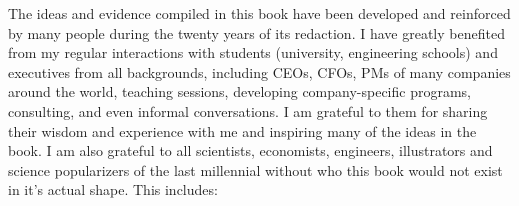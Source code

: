 The ideas and evidence compiled in this book have been developed and reinforced by many people during the twenty years of its redaction. I have greatly benefited from my regular interactions with students (university, engineering schools) and executives from all backgrounds, including CEOs, CFOs, PMs of many companies around the world, teaching sessions, developing company-specific programs, consulting, and even informal conversations. I am grateful to them for sharing their wisdom and experience with me and inspiring many of the ideas in the book. I am also grateful to all scientists, economists, engineers, illustrators and science popularizers of the last millennial without who this book would not exist in it's actual shape. This includes:

	\begin{spacing}{0.5}
	\begin{tiny}

\end{tiny}
\end{spacing}
